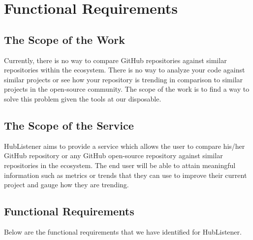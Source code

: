 \documentclass{article}
\begin{document}
\newpage
\section{Functional Requirements}

\subsection{The Scope of the Work}

Currently, there is no way to compare GitHub repositories against similar repositories within the ecosystem. There is no way to analyze your code against similar projects or see how your repository is trending in comparison to similar projects in the open-source community. The scope of the work is to find a way to solve this problem given the tools at our disposable.


\subsection{The Scope of the Service}
HubListener aims to provide a service which allows the user to compare his/her GitHub repository or any GitHub open-source repository against similar repositories in the ecosystem. The end user will be able to attain meaningful information such as metrics or trends that they can use to improve their current project and gauge how they are trending. 

\subsection{Functional Requirements }

Below are the functional requirements that we have identified for HubListener.
\end{document}
